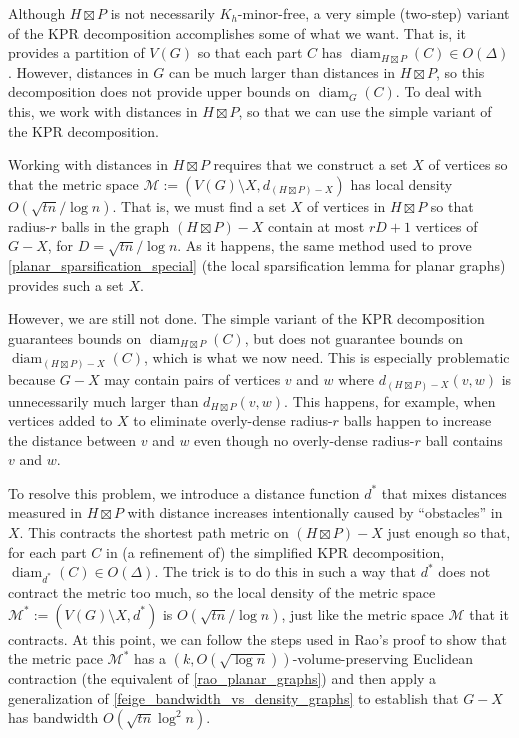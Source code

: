 \documentclass{patmorin}
\DeclareMathOperator{\diam}{diam}
\begin{document}

Although $H\boxtimes P$ is not necessarily $K_h$-minor-free, a very simple (two-step) variant of the KPR decomposition accomplishes some of what we want.  That is, it provides a partition of $V(G)$ so that each part $C$ has $\diam_{H\boxtimes P}(C)\in O(\Delta)$. However, distances in $G$ can be much larger than distances in $H\boxtimes P$, so this decomposition does not provide upper bounds on $\diam_G(C)$.  To deal with this, we work with distances in $H\boxtimes P$, so that we can use the simple variant of the KPR decomposition.

Working with distances in $H\boxtimes P$ requires that we construct a set $X$ of vertices so that the metric space $\mathcal{M}:=(V(G)\setminus X,d_{(H\boxtimes P)-X})$ has local density $O(\sqrt{tn}/\log n)$.  That is, we must find a set $X$  of vertices in $H\boxtimes P$ so that radius-$r$ balls in the graph $(H\boxtimes P)-X$ contain at most $rD+1$ vertices of $G-X$, for $D=\sqrt{tn}/\log n$.  As it happens, the same method used to prove \cref{planar_sparsification_special} (the local sparsification lemma for planar graphs) provides such a set $X$.

However, we are still not done.  The simple variant of the KPR decomposition guarantees bounds on $\diam_{H\boxtimes P}(C)$, but does not guarantee bounds on $\diam_{(H\boxtimes P)-X}(C)$, which is what we now need.  This is especially problematic because $G-X$ may contain pairs of vertices $v$ and $w$ where $d_{(H\boxtimes P)-X}(v,w)$ is unnecessarily much larger than $d_{H\boxtimes P}(v,w)$.  This happens, for example, when vertices added to $X$ to eliminate overly-dense radius-$r$ balls happen to increase the distance between $v$ and $w$ even though no overly-dense radius-$r$ ball contains $v$ and $w$.

To resolve this problem, we introduce a distance function $d^*$ that mixes distances measured in $H\boxtimes P$ with distance increases intentionally caused by ``obstacles'' in $X$.  This contracts the shortest path metric on $(H\boxtimes P)-X$ just enough so that, for each part $C$ in (a refinement of) the simplified KPR decomposition, $\diam_{d^*}(C)\in O(\Delta)$. The trick is to do this in such a way that $d^*$ does not contract the metric too much, so the local density of the metric space $\mathcal{M}^*:=(V(G)\setminus X,d^*)$ is $O(\sqrt{tn}/\log n)$, just like the metric space $\mathcal{M}$ that it contracts.  At this point, we can follow the steps used in Rao's proof to show that the metric pace $\mathcal{M}^*$ has a $(k,O(\sqrt{\log n}))$-volume-preserving Euclidean contraction (the equivalent of \cref{rao_planar_graphs}) and then apply a generalization of \cref{feige_bandwidth_vs_density_graphs} to establish that $G-X$ has bandwidth $O(\sqrt{tn}\log^2 n)$.
\end{document}
